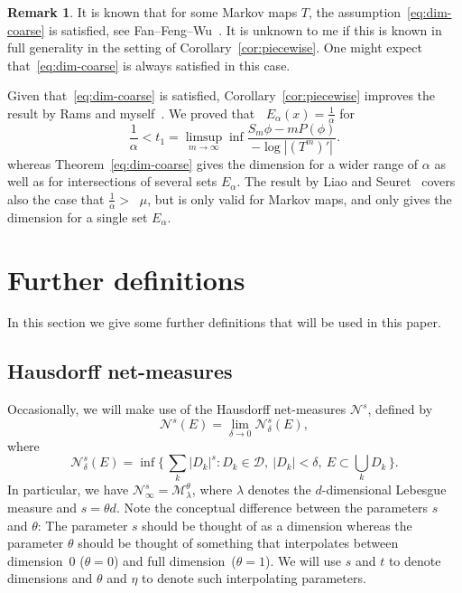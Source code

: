 \documentclass[11pt]{article}
\theoremstyle{definition}
\newtheorem{rema}[theo]{Remark}
\numberwithin{equation}{section}
\numberwithin{figure}{section}
\numberwithin{table}{section}
\DeclareMathOperator{\dimh}{dim_H}
\begin{document}
\begin{rema}
It is known that for some Markov maps $T$, the assumption~\eqref{eq:dim-coarse} is satisfied, see Fan--Feng--Wu~\cite{fanfengwu}. It is unknown to me if this is known in full generality in the setting of Corollary~\ref{cor:piecewise}. One might expect that~\eqref{eq:dim-coarse} is always satisfied in this case.

Given that~\eqref{eq:dim-coarse} is satisfied, Corollary~\ref{cor:piecewise} improves the result by Rams and myself~\cite[Theorem~2]{perssonrams}. We proved that $\dimh E_\alpha (x) =
\frac{1}{\alpha}$ for
\[
\frac{1}{\alpha} < t_1 = \limsup_{m\to \infty} \inf \frac{S_m \phi - m P(\phi)}{- \log |(T^m)'|}.
\]
whereas Theorem~\ref{eq:dim-coarse} gives the dimension for a wider range of $\alpha$ as well as for intersections of several sets $E_\alpha$. The result by Liao and Seuret~\cite{liaoseuret} covers also the case that $\frac{1}{\alpha} > \dimh \mu$, but is only valid for Markov maps, and only gives the dimension for a single set $E_\alpha$.
\end{rema}



\section{Further definitions} \label{sec:furtherdefinitions}

In this section we give some further definitions that will be used in this paper.

\subsection{Hausdorff net-measures}

Occasionally, we will make use of the Hausdorff net-measures $\mathscr{N}^s$, defined by
\[
\mathscr{N}^s (E) = \lim_{\delta \to 0} \mathscr{N}_\delta^s (E),
\]
where
\[
\mathscr{N}_\delta^s (E) = \inf \biggl\{\, \sum_k |D_k|^s : D_k
\in \mathscr{D}, \ |D_k| < \delta,\ E \subset \bigcup_k D_k
\,\biggr\}.
\]
In particular, we have $\mathscr{N}_\infty^s =
\mathscr{M}_\lambda^{\theta}$, where $\lambda$ denotes the $d$-dimensional Lebesgue measure and $s = \theta d$. Note the conceptual difference between the parameters $s$ and $\theta$: The parameter $s$ should be thought of as a dimension whereas the parameter $\theta$ should be thought of something that interpolates between dimension~0 ($\theta = 0$) and full dimension~($\theta = 1$). We will use $s$ and $t$ to denote dimensions and $\theta$ and $\eta$ to denote such interpolating parameters.
\end{document}
